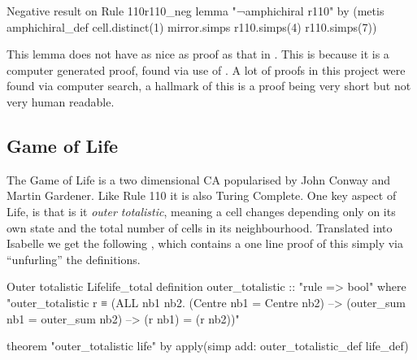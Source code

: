 \begin{myminted}{Negative result on Rule 110}{r110_neg}
    lemma "¬amphichiral r110"
by (metis amphichiral_def cell.distinct(1) mirror.simps r110.simps(4) r110.simps(7))
\end{myminted}

This lemma does not have as nice as proof as that in .
This is because it is a computer generated proof,
found via use of .
A lot of proofs in this project were found via computer search,
a hallmark of this is a proof being very short but not very human readable.

\subsection{Game of Life}
The Game of Life is a two dimensional CA popularised by John Conway and Martin Gardener.
Like Rule 110 it is also Turing Complete.
One key aspect of Life,
is that is it \emph{outer totalistic},
meaning a cell changes depending only on its own state
and the total number of  cells in its neighbourhood.
Translated into Isabelle we get the following ,
which contains a one line proof of this simply via ``unfurling'' the definitions.

\begin{myminted}{Outer totalistic Life}{life_total}
    definition outer_totalistic :: "rule => bool" where
    "outer_totalistic r ≡ (ALL nb1 nb2. (Centre nb1 = Centre nb2)
    --> (outer_sum nb1 = outer_sum nb2) --> (r nb1) = (r nb2))"

    theorem "outer_totalistic life"
    by apply(simp add: outer_totalistic_def life_def)
\end{myminted}
